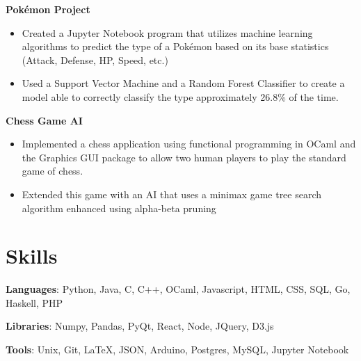 \documentclass[letterpaper,2pt]{article}
\begin{document}
        \textbf{Pok\'emon Project} 
        \vspace{-7pt}
        \begin{itemize}
          \setlength\itemsep{-1pt}
          \item Created a Jupyter Notebook program that utilizes machine learning algorithms to predict the type of a Pok\'emon based on its base statistics (Attack, Defense, HP, Speed, etc.)
          \item Used a Support Vector Machine and a Random Forest Classifier to create a model able to correctly classify the type approximately 26.8\% of the time.
        \end{itemize}
        \vspace{-5pt}

 \textbf{Chess Game AI}
 \vspace{-7pt}
 \begin{itemize}
   \setlength\itemsep{-1pt}
   \item Implemented a chess application using functional programming in OCaml and the Graphics GUI package to allow two human players to play the standard game of chess. 
   \item Extended this game with an AI that uses a minimax game tree search algorithm enhanced using alpha-beta pruning
 \end{itemize}



\section{Skills}

    \vspace{3pt} 

    \textbf{Languages}: {Python, Java, C, C++, OCaml, Javascript, HTML, CSS, SQL, Go, Haskell, PHP}

    \vspace{3pt}

    \textbf{Libraries}: {Numpy, Pandas, PyQt, React, Node, JQuery, D3.js}

    \vspace{3pt}

    \textbf{Tools}: {Unix, Git, \LaTeX, JSON, Arduino, Postgres, MySQL, Jupyter Notebook}


\end{document}
